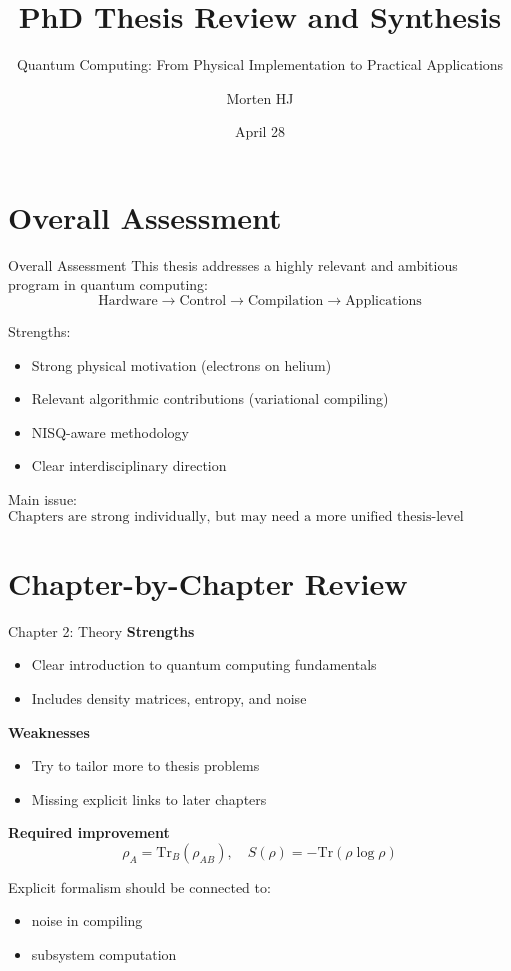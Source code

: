 \documentclass[aspectratio=169]{beamer}
\title{PhD Thesis Review and Synthesis}
\subtitle{Quantum Computing: From Physical Implementation to Practical Applications}
\author{Morten HJ}
\date{April 28}
\begin{document}
\frame{\titlepage}

\section{Overall Assessment}

\begin{frame}{Overall Assessment}
This thesis addresses a highly relevant and ambitious program in quantum computing:
\[
\text{Hardware} \rightarrow \text{Control} \rightarrow \text{Compilation} \rightarrow \text{Applications}
\]

\medskip

Strengths:
\begin{itemize}
    \item Strong physical motivation (electrons on helium)
    \item Relevant algorithmic contributions (variational compiling)
    \item NISQ-aware methodology
    \item Clear interdisciplinary direction
\end{itemize}

\medskip

Main issue:
\[
\text{Chapters are strong individually, but may need a  more unified thesis-level narrative/story/red thread}
\]
\end{frame}

\section{Chapter-by-Chapter Review}

\begin{frame}{Chapter 2: Theory}
\textbf{Strengths}
\begin{itemize}
    \item Clear introduction to quantum computing fundamentals
    \item Includes density matrices, entropy, and noise
\end{itemize}

\medskip

\textbf{Weaknesses}
\begin{itemize}
    \item Try to tailor more  to thesis problems
    \item Missing explicit links to later chapters
\end{itemize}

\medskip

\textbf{Required improvement}
\[
\rho_A = \mathrm{Tr}_B(\rho_{AB}), \quad
S(\rho) = -\mathrm{Tr}(\rho \log \rho)
\]

Explicit formalism should be connected to:
\begin{itemize}
    \item noise in compiling
    \item subsystem computation
\end{itemize}
\end{frame}
\end{document}
